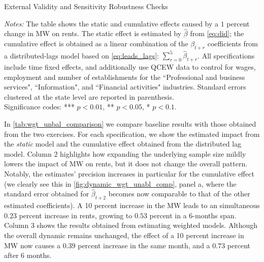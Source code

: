\begin{table}[h!]\centering
	\caption{External Validity and Sensitivity Robustness Checks}
	\label{tab:wgt_unbal_comparison}
	\resizebox{0.8\textwidth}{!}{
		
	}
	\begin{minipage}{\textwidth}\footnotesize
	\vspace{3mm}	
	\textit{Notes:} The table shows the static and cumulative effects caused by a $1$ percent
	change in MW on rents. The static effect is estimated by $\hat{\beta}$ from \autoref{eq:did};
	the cumulative effect is obtained as a linear combination of the $\beta_{t+r}$ coefficients from 
	a distributed-lags model based on \autoref{eq:leads_lags}: 
	$\sum\limits_{r = 0}^5 \hat{\beta}_{t+r}$. All specifications include time fixed effects, 
	and additionally use QCEW data to control for wages, employment and number of establishments 
	for the ``Professional and business services", ``Information", and ``Financial activities" industries.
	Standard errors clustered at the state level are
	reported in parenthesis. \\
	Significance codes: *** $p < 0.01$, ** $p < 0.05$, * $p < 0.1$. 	
	\end{minipage}
\end{table}

In \autoref{tab:wgt_unbal_comparison} we compare baseline results with those obtained from the 
two exercises. For each specification, we show the estimated impact
from the \textit{static} model and the cumulative effect obtained from the distributed lag model. Column 
2 highlights how expanding the underlying sample size mildly lowers the impact of MW on rents, but 
it does not change the overall pattern. Notably, the estimates' precision increases in particular for 
the cumulative effect (we clearly see this in \autoref{fig:dynamic_wgt_unabl_comp}, panel a, where 
the standard error obtained for $\hat{\beta}_{t+2}$  becomes now comparable to 
that of the other estimated coefficients). A 10 percent increase in the MW leads to an simultaneous 
$0.23$ percent increase in rents, growing to $0.53$ percent in a 6-months span. Column 3 shows 
the results obtained from estimating weighted models. Although the overall dynamic remains unchanged, 
the effect of a 10 percent increase in MW now causes a $0.39$ percent increase in the same month, and 
a $0.73$ percent after 6 months. %



